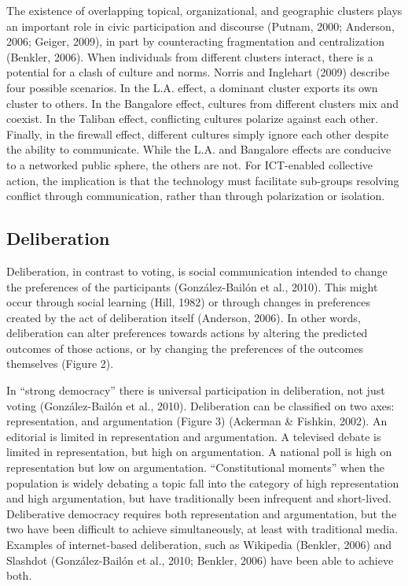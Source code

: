 The existence of overlapping topical, organizational, and geographic clusters plays an important role in civic participation and discourse (Putnam, 2000; Anderson, 2006; Geiger, 2009), in part by counteracting fragmentation and centralization (Benkler, 2006). When individuals from different clusters interact, there is a potential for a clash of culture and norms. Norris and Inglehart (2009) describe four possible scenarios. In the L.A. effect, a dominant cluster exports its own cluster to others. In the Bangalore effect, cultures from different clusters mix and coexist. In the Taliban effect, conflicting cultures polarize against each other. Finally, in the firewall effect, different cultures simply ignore each other despite the ability to communicate. While the L.A. and Bangalore effects are conducive to a networked public sphere, the others are not. For ICT-enabled collective action, the implication is that the technology must facilitate sub-groups resolving conflict through communication, rather than through polarization or isolation.

\subsection{Deliberation}
Deliberation, in contrast to voting, is social communication intended to change the preferences of the participants (Gonz\'alez-Bail\'on et al., 2010). This might occur through social learning (Hill, 1982) or through changes in preferences created by the act of deliberation itself (Anderson, 2006). In other words, deliberation can alter preferences towards actions by altering the predicted outcomes of those actions, or by changing the preferences of the outcomes themselves (Figure 2).

In ``strong democracy'' there is universal participation in deliberation, not just voting (Gonz\'alez-Bail\'on et al., 2010). Deliberation can be classified on two axes: representation, and argumentation (Figure 3) (Ackerman \& Fishkin, 2002). An editorial is limited in representation and argumentation. A televised debate is limited in representation, but high on argumentation. A national poll is high on representation but low on argumentation. ``Constitutional moments'' when the population is widely debating a topic fall into the category of high representation and high argumentation, but have traditionally been infrequent and short-lived. Deliberative democracy requires both representation and argumentation, but the two have been difficult to achieve simultaneously, at least with traditional media. Examples of internet-based deliberation, such as Wikipedia (Benkler, 2006) and Slashdot (Gonz\'alez-Bail\'on et al., 2010; Benkler, 2006) have been able to achieve both.

